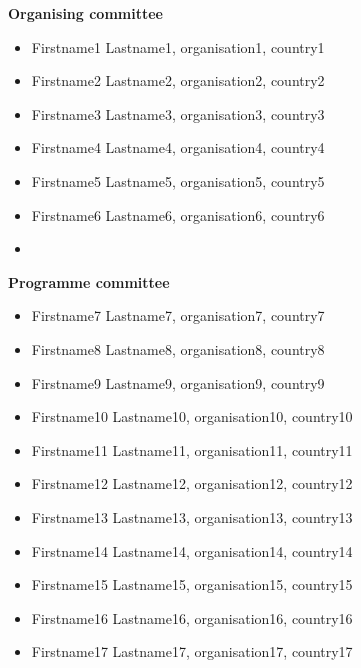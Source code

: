 \label{awec:committees}
%
\vspace{60mm}
\begin{multicols}{2}
{\bfseries Organising committee}
\begin{itemize}
\item Firstname1 Lastname1, organisation1, country1
\item Firstname2 Lastname2, organisation2, country2
\item Firstname3 Lastname3, organisation3, country3
\item Firstname4 Lastname4, organisation4, country4
\item Firstname5 Lastname5, organisation5, country5
\item Firstname6 Lastname6, organisation6, country6
\item[]
\end{itemize}

{\bfseries Programme committee}
\begin{itemize}
  \item Firstname7 Lastname7, organisation7, country7
  \item Firstname8 Lastname8, organisation8, country8
  \item Firstname9 Lastname9, organisation9, country9
  \item Firstname10 Lastname10, organisation10, country10
  \item Firstname11 Lastname11, organisation11, country11
  \item Firstname12 Lastname12, organisation12, country12
  \item Firstname13 Lastname13, organisation13, country13
  \item Firstname14 Lastname14, organisation14, country14
  \item Firstname15 Lastname15, organisation15, country15
  \item Firstname16 Lastname16, organisation16, country16
  \item Firstname17 Lastname17, organisation17, country17
\end{itemize}
\vfill

\end{multicols}

\newpage
